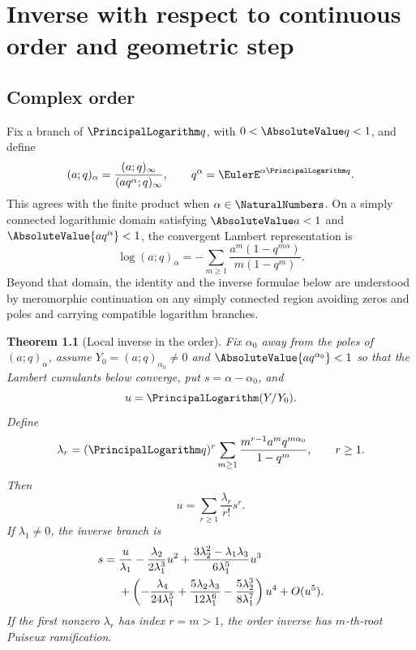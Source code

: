 \documentclass[11pt,a4paper,oneside,openany]{book}
\newtheorem{theorem}{Theorem}[chapter]
\theoremstyle{definition}
\theoremstyle{remark}
\begin{document}
\chapter{Inverse with respect to continuous order and geometric step}

\section{Complex order}

Fix a branch of \(\PrincipalLogarithm q\), with \(0<\AbsoluteValue q<1\), and define
\begin{equation}\label{eq:complex-order-definition}
 (a;q)_\alpha=\frac{(a;q)_\infty}{(aq^\alpha;q)_\infty},
 \qquad q^\alpha=\EulerE^{\alpha\PrincipalLogarithm q}.
\end{equation}
This agrees with the finite product when \(\alpha\in\NaturalNumbers\).  On a
simply connected logarithmic domain satisfying
\(\AbsoluteValue a<1\) and \(\AbsoluteValue{aq^\alpha}<1\), the convergent Lambert
representation is
\begin{equation}\label{eq:complex-order-lambert}
 \log(a;q)_\alpha
 =-\sum_{m\ge1}\frac{a^m(1-q^{m\alpha})}{m(1-q^m)}.
\end{equation}
Beyond that domain, the identity and the inverse formulae below are understood
by meromorphic continuation on any simply connected region avoiding zeros and
poles and carrying compatible logarithm branches.

\begin{theorem}[Local inverse in the order]\label{thm:order-local-inverse}
Fix \(\alpha_0\) away from the poles of \((a;q)_\alpha\), assume
\(Y_0=(a;q)_{\alpha_0}\ne0\) and \(\AbsoluteValue{a q^{\alpha_0}}<1\) so that the
Lambert cumulants below converge, put \(s=\alpha-\alpha_0\), and
\[
 u=\PrincipalLogarithm(Y/Y_0).
\]
Define
\begin{equation}\label{eq:lambda-order}
 \lambda_r=(\PrincipalLogarithm q)^r\sum_{m\ge1}
 \frac{m^{r-1}a^m q^{m\alpha_0}}{1-q^m},\qquad r\ge1.
\end{equation}
Then
\begin{equation}\label{eq:order-forward-local}
 u=\sum_{r\ge1}\frac{\lambda_r}{r!}s^r.
\end{equation}
If \(\lambda_1\ne0\), the inverse branch is
\begin{align}
 s={}&\frac{u}{\lambda_1}
 -\frac{\lambda_2}{2\lambda_1^3}u^2
 +\frac{3\lambda_2^2-\lambda_1\lambda_3}{6\lambda_1^5}u^3\notag\\
 &+\left(-\frac{\lambda_4}{24\lambda_1^5}
 +\frac{5\lambda_2\lambda_3}{12\lambda_1^6}
 -\frac{5\lambda_2^3}{8\lambda_1^7}\right)u^4+O(u^5).
\label{eq:order-inverse-local}
\end{align}
If the first nonzero \(\lambda_r\) has index \(r=m>1\), the order inverse
has \(m\)-th-root Puiseux ramification.
\end{theorem}
\end{document}
